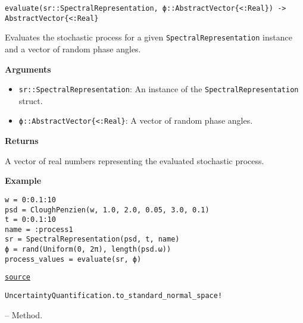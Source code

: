 \begin{adjustwidth}{2em}{0pt}


\begin{verbatim}
evaluate(sr::SpectralRepresentation, ϕ::AbstractVector{<:Real}) -> AbstractVector{<:Real}
\end{verbatim}

Evaluates the stochastic process for a given \texttt{SpectralRepresentation} instance and a vector of random phase angles.

\textbf{Arguments}

\begin{itemize}
\item \texttt{sr::SpectralRepresentation}: An instance of the \texttt{SpectralRepresentation} struct.


\item \texttt{ϕ::AbstractVector\{<:Real\}}: A vector of random phase angles.

\end{itemize}
\textbf{Returns}

A vector of real numbers representing the evaluated stochastic process.

\textbf{Example}


\begin{verbatim}
w = 0:0.1:10
psd = CloughPenzien(w, 1.0, 2.0, 0.05, 3.0, 0.1)
t = 0:0.1:10
name = :process1
sr = SpectralRepresentation(psd, t, name)
ϕ = rand(Uniform(0, 2π), length(psd.ω))
process_values = evaluate(sr, ϕ)
\end{verbatim}



\href{https://github.com/friesischscott/UncertaintyQuantification.jl/blob/f5ee6cce729f0d6a57979257379c942cdf42f86f/src/inputs/stochasticprocesses/spectralrepresentation.jl#L87-L110}{\texttt{source}}


\end{adjustwidth}
\hypertarget{1433719112274392831}{\texttt{UncertaintyQuantification.to\_standard\_normal\_space!}}  -- {Method.}

